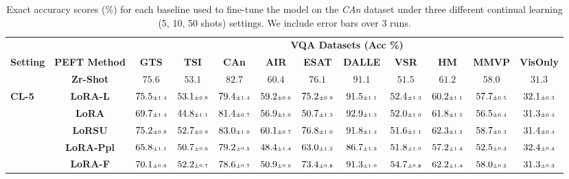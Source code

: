 \begin{table}
\caption{Exact accuracy scores (\%) for each baseline used to fine-tune the model on the \emph{CAn} dataset under three different continual learning (5, 10, 50 shots)  settings. We include error bars over 3 runs.}
 \label{table:fine_tune_llm_counteranimal}
\vskip 0.15in
\begin{center}
\begin{small}
\begingroup
\setlength{\tabcolsep}{3.6pt}
\begin{tabular}{l c c c c c c c c c c c}
\toprule
 & & \multicolumn{10}{c}{\textbf{VQA Datasets (Acc \%)}}  \\
\cmidrule(lr){3-12}
\textbf{Setting} & \textbf{PEFT Method}  & \textbf{GTS} & \textbf{TSI} & \textbf{CAn} & \textbf{AIR} & \textbf{ESAT} & \textbf{DALLE} & \textbf{VSR} & \textbf{HM} & \textbf{MMVP} & \textbf{VisOnly} \\
\midrule
 & \textbf{Zr-Shot} & $75.6$ & $53.1$ & $82.7$ & $60.4$ & $76.1$ & $91.1$ & $51.5$ & $61.2$ & $58.0$ & $31.3$ \\
\midrule
\multirow{6}{*}{\textbf{CL-5}} & \textbf{LoRA-L} & $75.5 \mbox{\tiny\ensuremath{\pm 1.4}}$ & $53.1 \mbox{\tiny\ensuremath{\pm 0.8}}$ & $79.4 \mbox{\tiny\ensuremath{\pm 1.4}}$ & $59.2 \mbox{\tiny\ensuremath{\pm 0.6}}$ & $75.2 \mbox{\tiny\ensuremath{\pm 0.9}}$ & $91.5 \mbox{\tiny\ensuremath{\pm 1.1}}$ & $52.4 \mbox{\tiny\ensuremath{\pm 1.3}}$ & $60.2 \mbox{\tiny\ensuremath{\pm 1.1}}$ & $57.7 \mbox{\tiny\ensuremath{\pm 0.5}}$ & $32.1 \mbox{\tiny\ensuremath{\pm 0.3}}$ \\
& \textbf{LoRA} & $69.7 \mbox{\tiny\ensuremath{\pm 1.4}}$ & $44.8 \mbox{\tiny\ensuremath{\pm 1.1}}$ & $81.4 \mbox{\tiny\ensuremath{\pm 0.7}}$ & $56.9 \mbox{\tiny\ensuremath{\pm 1.0}}$ & $50.7 \mbox{\tiny\ensuremath{\pm 1.3}}$ & $92.9 \mbox{\tiny\ensuremath{\pm 1.3}}$ & $52.0 \mbox{\tiny\ensuremath{\pm 1.0}}$ & $61.8 \mbox{\tiny\ensuremath{\pm 1.5}}$ & $56.5 \mbox{\tiny\ensuremath{\pm 0.4}}$ & $31.3 \mbox{\tiny\ensuremath{\pm 0.4}}$ \\
& \textbf{LoRSU} & $75.2 \mbox{\tiny\ensuremath{\pm 0.8}}$ & $52.7 \mbox{\tiny\ensuremath{\pm 0.9}}$ & $83.0 \mbox{\tiny\ensuremath{\pm 1.0}}$ & $60.1 \mbox{\tiny\ensuremath{\pm 0.7}}$ & $76.8 \mbox{\tiny\ensuremath{\pm 1.0}}$ & $91.8 \mbox{\tiny\ensuremath{\pm 1.4}}$ & $51.6 \mbox{\tiny\ensuremath{\pm 1.1}}$ & $62.3 \mbox{\tiny\ensuremath{\pm 1.2}}$ & $58.7 \mbox{\tiny\ensuremath{\pm 0.3}}$ & $31.4 \mbox{\tiny\ensuremath{\pm 0.4}}$ \\
& \textbf{LoRA-Ppl} & $65.8 \mbox{\tiny\ensuremath{\pm 1.1}}$ & $50.7 \mbox{\tiny\ensuremath{\pm 0.6}}$ & $79.2 \mbox{\tiny\ensuremath{\pm 0.5}}$ & $48.4 \mbox{\tiny\ensuremath{\pm 1.4}}$ & $63.0 \mbox{\tiny\ensuremath{\pm 1.2}}$ & $86.7 \mbox{\tiny\ensuremath{\pm 1.3}}$ & $51.8 \mbox{\tiny\ensuremath{\pm 1.0}}$ & $57.2 \mbox{\tiny\ensuremath{\pm 1.4}}$ & $52.5 \mbox{\tiny\ensuremath{\pm 0.3}}$ & $32.4 \mbox{\tiny\ensuremath{\pm 0.4}}$ \\
& \textbf{LoRA-F} & $70.1 \mbox{\tiny\ensuremath{\pm 0.6}}$ & $52.2 \mbox{\tiny\ensuremath{\pm 0.7}}$ & $78.6 \mbox{\tiny\ensuremath{\pm 0.7}}$ & $50.9 \mbox{\tiny\ensuremath{\pm 0.9}}$ & $73.4 \mbox{\tiny\ensuremath{\pm 0.8}}$ & $91.3 \mbox{\tiny\ensuremath{\pm 1.0}}$ & $54.7 \mbox{\tiny\ensuremath{\pm 0.8}}$ & $62.2 \mbox{\tiny\ensuremath{\pm 1.4}}$ & $58.0 \mbox{\tiny\ensuremath{\pm 0.5}}$ & $31.3 \mbox{\tiny\ensuremath{\pm 0.3}}$ \\

\end{tabular}
\end{small}
\end{center}
\end{table}
